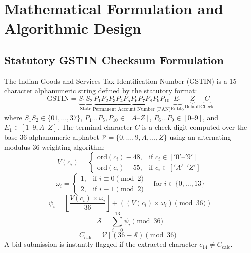 \documentclass[conference]{IEEEtran}
\begin{document}
\section{Mathematical Formulation and Algorithmic Design}

\subsection{Statutory GSTIN Checksum Formulation}
The Indian Goods and Services Tax Identification Number (GSTIN) is a 15-character alphanumeric string defined by the statutory format:
\begin{equation}
\text{GSTIN} = \underbrace{S_1 S_2}_{\text{State}} \underbrace{P_1 P_2 P_3 P_4 P_5 P_6 P_7 P_8 P_9 P_{10}}_{\text{Permanent Account Number (PAN)}} \underbrace{E_1}_{\text{Entity}} \underbrace{Z}_{\text{Default}} \underbrace{C}_{\text{Check}}
\end{equation}
where $S_1 S_2 \in \{01, \dots, 37\}$, $P_1\dots P_5, P_{10} \in [A\text{--}Z]$, $P_6\dots P_9 \in [0\text{--}9]$, and $E_1 \in [1\text{--}9, A\text{--}Z]$. The terminal character $C$ is a check digit computed over the base-36 alphanumeric alphabet $\mathcal{V} = \{0,\dots,9,A,\dots,Z\}$ using an alternating modulus-36 weighting algorithm:
\begin{equation}
V(c_i) = \begin{cases}
\text{ord}(c_i) - 48, & \text{if } c_i \in ['0'\text{--}'9'] \\
\text{ord}(c_i) - 55, & \text{if } c_i \in ['A'\text{--}'Z']
\end{cases}
\end{equation}
\begin{equation}
\omega_i = \begin{cases}
1, & \text{if } i \equiv 0 \pmod 2 \\
2, & \text{if } i \equiv 1 \pmod 2
\end{cases} \quad \text{for } i \in \{0, \dots, 13\}
\end{equation}
\begin{equation}
\psi_i = \left\lfloor \frac{V(c_i) \times \omega_i}{36} \right\rfloor + \left((V(c_i) \times \omega_i) \pmod{36}\right)
\end{equation}
\begin{equation}
\mathcal{S} = \sum_{i=0}^{13} \psi_i \pmod{36}
\end{equation}
\begin{equation}
C_{\text{calc}} = \mathcal{V}\left[(36 - \mathcal{S}) \pmod{36}\right]
\end{equation}
A bid submission is instantly flagged if the extracted character $c_{14} \ne C_{\text{calc}}$.
\end{document}
